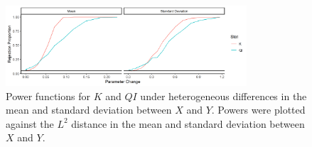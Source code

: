 \documentclass[12pt]{article}
\begin{document}
 



\begin{figure}
	\begin{center}
    \includegraphics[width=0.8\textwidth,valign=c]{power/multi_het.png}
    \caption{Power functions for $K$ and $QI$ under heterogeneous differences in the mean and standard deviation between $X$ and $Y$. Powers were plotted against the $L^2$ distance in the mean and standard deviation between $X$ and $Y$.}
    \label{power2dstoch}
    \end{center}
\end{figure}
\end{document}
